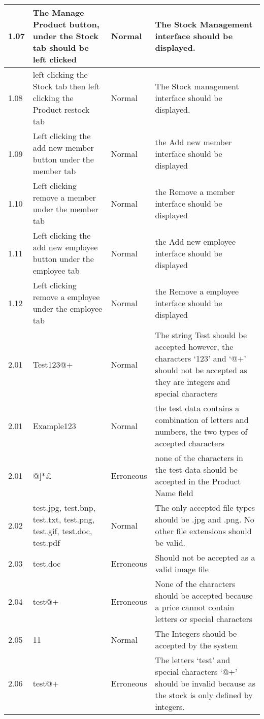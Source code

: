 \begin{flushleft}
\begin{longtable}{|p{1.5cm}|p{2.5cm}|p{2cm}|p{4.5cm}|}
	1.07 & The Manage Product button, under the Stock tab should be left clicked &  Normal & The Stock Management interface should be displayed.  \\ \hline
	1.08 &  left clicking the Stock tab then left clicking the Product restock tab &  Normal & The Stock management interface should be displayed.  \\ \hline
	1.09 &  Left clicking the add new member button under the member tab &  Normal & the Add new member interface should be displayed \\ \hline
	1.10 & Left clicking remove a member under the member tab & Normal & the Remove a member interface should be displayed  \\ \hline
	1.11 & Left clicking the add new employee button under the employee tab &  Normal & the Add new employee interface should be displayed \\ \hline
	1.12 & Left clicking remove a employee under the employee tab & Normal & the Remove a employee interface should be displayed  \\ \hline
	\rowcolor{dark-grey}2.01 & Test123@+ & Normal & The string Test should be accepted however, the characters `123' and `@+' should not be accepted as they are integers and special characters  \\ \hline
	\rowcolor{light-grey}2.01 & Example123 & Normal & the test data contains a combination of letters and numbers, the two types of accepted characters   \\ \hline
	\rowcolor{light-grey}2.01 &  @]*£  & Erroneous & none of the characters in the test data should be accepted in the Product Name field   \\ \hline
	\rowcolor{dark-grey}2.02 &  test.jpg, test.bnp, test.txt, test.png, test.gif, test.doc, test.pdf & Normal & The only accepted file types should be .jpg and .png. No other file extensions should be valid.  \\ \hline
	2.03 &  test.doc & Erroneous &  Should not be accepted as a valid image file  \\ \hline
	2.04 &  test@+ & Erroneous  &  None of the characters should be accepted because a price cannot contain letters or special characters  \\ \hline
	2.05 &  11  & Normal & The Integers should be accepted by the system \\ \hline
	2.06 &  test@+ & Erroneous & The letters `test' and special characters `@+' should be invalid because as the stock is only defined by integers. \\ \hline

\end{longtable}
\end{flushleft}
